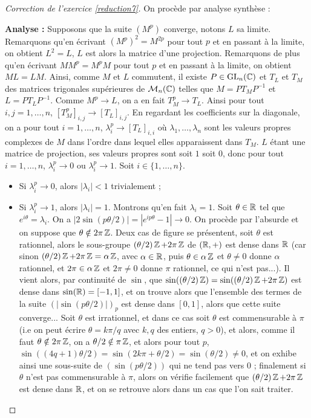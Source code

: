 \begin{proof}[Correction de l'exercice \ref{reduction7}]
    On procède par analyse synthèse :

    \textbf{Analyse :} Supposons que la suite $(M^p)$ converge, notons $L$ sa limite.
    Remarquons qu'en écrivant $(M^p)^2=M^{2p}$ pour tout $p$ et en passant à la limite, on obtient $L^2=L$,
    $L$ est alors la matrice d'une projection. Remarquons de plus qu'en écrivant $MM^p=M^pM$ pour tout $p$ et en passant à la limite, on obtient $ML=LM$.
    Ainsi, comme $M$ et $L$ commutent, il existe $P\in\operatorname{GL}_n(\operatorname{\mathbb C})$ et $T_L$ et $T_M$ des matrices trigonales supérieures de $\mathcal M_n(\operatorname{\mathbb C})$ telles que 
    $M=PT_MP^{-1}$ et $L=PT_LP^{-1}$. 
    Comme $M^p\to L$, on a en fait $T_M^p\to T_L$. 
    Ainsi pour tout $i,j=1,\dots,n$, $[T_M^p]_{i,j}\to [T_L]_{i,j}$.
    En regardant les coefficients sur la diagonale, on a pour tout $i=1,\dots,n$, $\lambda_i^p\to [T_L]_{i,i}$
    où $\lambda_1,\dots,\lambda_n$ sont les valeurs propres complexes de $M$ dans l'ordre dans lequel elles apparaissent dans $T_M$.
    $L$ étant une matrice de projection, ses valeurs propres sont soit $1$ soit $0$, donc pour tout $i=1,\dots,n$,
    $\lambda_i^p\to 0$ ou $\lambda_i^p\to 1$.
    Soit $i\in\lbrace1,\dots,n\rbrace$.
    \begin{itemize}
        \item Si $\lambda_i^p\to 0$, alors $|\lambda_i|<1$ trivialement ;
        \item Si $\lambda_i^p\to 1$, alors $|\lambda_i|=1$. 
        Montrons qu'en fait $\lambda_i=1$. 
        Soit $\theta\in\operatorname{\mathbb R}$ tel que $e^{i\theta}=\lambda_i$.
        On a $|2\sin(p\theta/2)|=|e^{ip\theta}-1|\to 0$. 
        On procède par l'absurde et on suppose que $\theta \notin 2\pi\operatorname{\mathbb Z}$.
        Deux cas de figure se présentent, soit $\theta$ est rationnel, 
        alors le sous-groupe $(\theta/2)\operatorname{\mathbb Z}+2\pi\operatorname{\mathbb Z}$ de $(\operatorname{\mathbb R},+)$ est dense dans $\operatorname{\mathbb R}$
        (car sinon $(\theta/2)\operatorname{\mathbb Z}+2\pi\operatorname{\mathbb Z}=\alpha\operatorname{\mathbb Z}$, avec $\alpha\in\operatorname{\mathbb R}$, puis $\theta\in\alpha\operatorname{\mathbb Z}$ et $\theta\neq0$ donne $\alpha$ rationnel, 
        et $2\pi\in\alpha\operatorname{\mathbb Z}$ et $2\pi\neq 0$ donne $\pi$ rationnel, ce qui n'est pas...).
        Il vient alors, par continuité de $\sin$, que $\sin((\theta/2)\operatorname{\mathbb Z})=\sin((\theta/2)\operatorname{\mathbb Z}+2\pi\operatorname{\mathbb Z})$ est dense dans $\sin(\operatorname{\mathbb R})=[-1,1]$, et on trouve alors 
        que l'ensemble des termes de la suite $(|\sin(p\theta/2)|)_p$ est dense dans $[0,1]$, alors que cette suite converge... 
        Soit $\theta$ est irrationnel, et dans ce cas soit $\theta$ est commensurable à $\pi$ (i.e on peut écrire $\theta=k\pi/q$ avec $k,q$ des entiers, $q>0$),
        et alors, comme il faut $\theta\notin2\pi\operatorname{\mathbb Z}$, on a $\theta/2\notin\pi\operatorname{\mathbb Z}$, et alors pour tout $p$, $\sin((4q+1)\theta/2)=\sin(2k\pi+\theta/2)=\sin(\theta/2)\neq 0$,
        et on exhibe ainsi une sous-suite de $(\sin(p\theta/2))$ qui ne tend pas vers $0$ ; finalement si $\theta$ n'est pas commensurable à $\pi$, 
        alors on vérifie facilement que $(\theta/2)\operatorname{\mathbb Z}+2\pi\operatorname{\mathbb Z}$ est dense dans $\operatorname{\mathbb R}$, et on se retrouve alors dans un cas que l'on sait traiter.


\end{itemize}
\end{proof}
